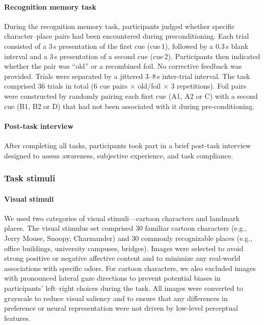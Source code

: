 \documentclass[12pt,letterpaper]{article}
\begin{document}
\paragraph*{Recognition memory task}

During the recognition memory task, participants judged whether specific character--place pairs had been encountered during preconditioning. Each trial consisted of a 3\,s presentation of the first cue (cue\,1), followed by a 0.3\,s blank interval and a 3\,s presentation of a second cue (cue\,2). Participants then indicated whether the pair was ``old'' or a recombined foil. No corrective feedback was provided. Trials were separated by a jittered 3--8\,s inter-trial interval. The task comprised 36 trials in total (6 cue pairs $\times$ old/foil $\times$ 3 repetitions). Foil pairs were constructed by randomly pairing each first cue (A1, A2 or C) with a second cue (B1, B2 or D) that had not been associated with it during pre-conditioning.

\paragraph*{Post-task interview}

After completing all tasks, participants took part in a brief post-task interview designed to assess awareness, subjective experience, and task compliance.

\subsubsection*{Task stimuli}

\paragraph*{Visual stimuli}

We used two categories of visual stimuli—cartoon characters and landmark places. The visual stimulus set comprised 30 familiar cartoon characters (e.g., Jerry Mouse, Snoopy, Charmander) and 30 commonly recognizable places (e.g., office buildings, university campuses, bridges). Images were selected to avoid strong positive or negative affective content and to minimize any real-world associations with specific odors. For cartoon characters, we also excluded images with pronounced lateral gaze directions to prevent potential biases in participants’ left–right choices during the task. All images were converted to grayscale to reduce visual saliency and to ensure that any differences in preference or neural representation were not driven by low-level perceptual features.
\end{document}
